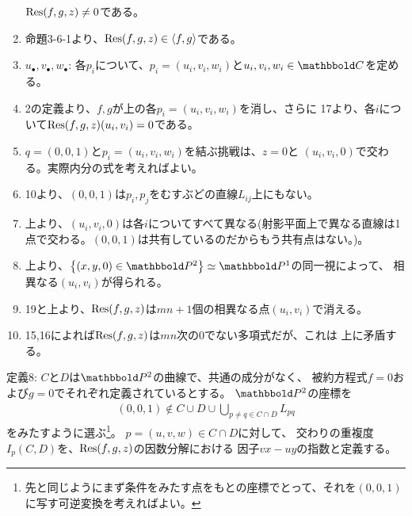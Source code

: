 \begin{myproof}
\begin{enumerate}
    $\mathrm{Res}(f,g,z) \neq 0$である。
    \item
    命題3-6-1より、$\mathrm{Res}(f,g,z)\in \left\langle f,g \right\rangle$である。
    \item $u_\bullet,v_\bullet,w_\bullet$:
    各$p_i$について、$p_i = (u_i,v_i,w_i)$と$u_i,v_i,w_i \in \C$を定める。
    \item
    2の定義より、$f,g$が上の各$p_i=(u_i,v_i,w_i)$を消し、さらに
    17より、各$i$について$\mathrm{Res}(f,g,z)(u_i,v_i)  = 0$である。
    \item
    $q=(0,0,1)$と$p_i=(u_i,v_i,w_i)$を結ぶ挑戦は、$z=0$と
    $(u_i,v_i,0)$で交わる。実際内分の式を考えればよい。
    \item
    10より、$(0,0,1)$は$p_i,p_j$をむすぶどの直線$L_{ij}$上にもない。
    \item
    上より、$(u_i,v_i,0)$は各$i$についてすべて異なる(射影平面上で異なる直線は1点で交わる。$(0,0,1)$は共有しているのだからもう共有点はない。)。
    \item
    上より、$\set{(x,y,0) \in \P^2} \simeq \P^1$の同一視によって、
    相異なる$(u_i,v_i)$が得られる。
    \item
    19と上より、$\mathrm{Res}(f,g,z)$は$mn+1$個の相異なる点$(u_i,v_i)$で消える。
    \item
    15,16によれば$\mathrm{Res}(f,g,z)$は$mn$次の0でない多項式だが、これは
    上に矛盾する。
  \end{enumerate}

\end{myproof}

\begin{framed}
  定義8:
  $C$と$D$は$\P^2$の曲線で、共通の成分がなく、
  被約方程式$f=0$および$g=0$でそれぞれ定義されているとする。
  $\P^2$の座標を
  \begin{align}
    (0,0,1) \notin C\cup D \cup \bigcup_{p\neq q \in C\cap D}L_{pq}
  \end{align}
  をみたすように選ぶ\footnote{先と同じようにまず条件をみたす点をもとの座標でとって、それを$(0,0,1)$に写す可逆変換を考えればよい。}。 $p=(u,v,w) \in C\cap D$に対して、
  交わりの重複度$I_p(C,D)$を、$\mathrm{Res}(f,g,z)$の因数分解における
  因子$vx-uy$の指数と定義する。
\end{framed}

